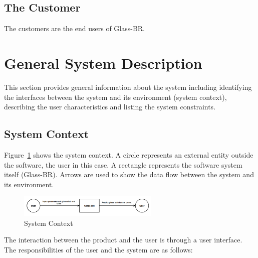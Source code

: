 \documentclass[12pt]{article}
\newcommand{\progname}{Glass-BR}
\begin{document}
\subsection{The Customer}

The customers are the end users of \progname{}.

\section{General System Description}

This section provides general information about the system including identifying
the interfaces between the system and its environment (system context), describing
the user characteristics and listing the system constraints.

\subsection{System Context}

Figure~\ref{Fig_SystemContext} shows the system context.  A circle represents an
external entity outside the software, the user in this case.  A rectangle
represents the software system itself (\progname{}).  Arrows are used to show the data
flow between the system and its environment.

\begin{figure}[h!]
	\begin{center}
		\includegraphics[width=0.6\textwidth]{SystemContextFigure.png}
		\caption{System Context}
		\label{Fig_SystemContext} 
	\end{center}
\end{figure}

The interaction between the product and the user is through a user
interface.  The responsibilities of the user and the system are as follows:
\end{document}
